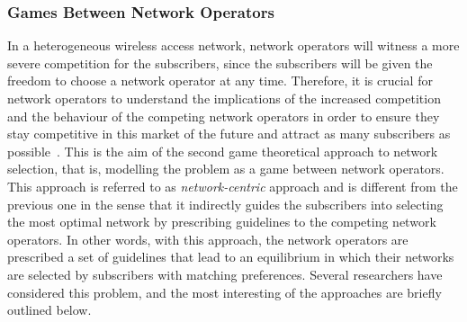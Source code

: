 \subsubsection{Games Between Network Operators} %
\label{ssub:games_between_network_operators}
In a heterogeneous wireless access network, network operators will witness a more severe competition for the subscribers, since the subscribers will be given the freedom to choose a network operator at any time. Therefore, it is crucial for network operators to understand the implications of the increased competition and the behaviour of the competing network operators in order to ensure they stay competitive in this market of the future and attract as many subscribers as possible~\cite{LushengKuo2013}. This is the aim of the second game theoretical approach to network selection, that is, modelling the problem as a game between network operators. This approach is referred to as \emph{network-centric} approach and is different from the previous one in the sense that it indirectly guides the subscribers into selecting the most optimal network by prescribing guidelines to the competing network operators. In other words, with this approach, the network operators are prescribed a set of guidelines that lead to an equilibrium in which their networks are selected by subscribers with matching preferences. Several researchers have considered this problem, and the most interesting of the approaches are briefly outlined below.

